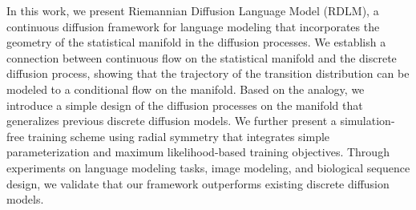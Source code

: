 In this work, we present Riemannian Diffusion Language Model (RDLM), a continuous diffusion framework for language modeling that incorporates the geometry of the statistical manifold in the diffusion processes.
We establish a connection between continuous flow on the statistical manifold and the discrete diffusion process, showing that the trajectory of the transition distribution can be modeled to a conditional flow on the manifold.
Based on the analogy, we introduce a simple design of the diffusion processes on the manifold that generalizes previous discrete diffusion models.
We further present a simulation-free training scheme using radial symmetry that integrates simple parameterization and maximum likelihood-based training objectives. 
Through experiments on language modeling tasks, image modeling, and biological sequence design, we validate that our framework outperforms existing discrete diffusion models.

